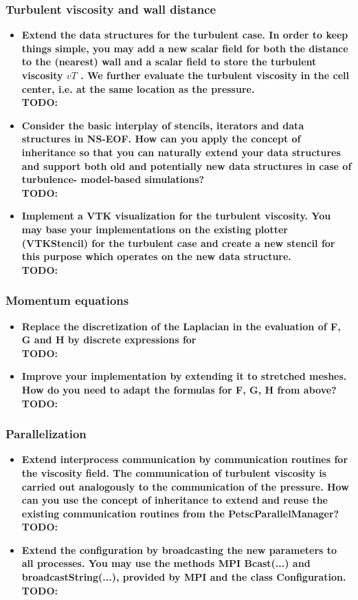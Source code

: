 \documentclass[a4paper]{article}
\newcommand{\td}[1]{
	\textbf{\color{red}TODO: {#1}}
}
\begin{document}
\subsubsection{Turbulent viscosity and wall distance}
\begin{itemize}
	\item \textbf{Extend the data structures for the turbulent case. In order to keep things simple, you may add a new scalar field for both the distance to the (nearest) wall and a scalar field to store the turbulent viscosity $vT$ . We further evaluate the turbulent viscosity in the cell center, i.e. at the same location as the pressure.}\\
	\td{}
	\item \textbf{Consider the basic interplay of stencils, iterators and data structures in NS-EOF. How can you apply the concept of inheritance so that you can naturally extend your data structures and support both old and potentially new data structures in case of turbulence- model-based simulations?}\\
	\td{}
	\item \textbf{Implement a VTK visualization for the turbulent viscosity. You may base your implementations on the existing plotter (VTKStencil) for the turbulent case and create a new stencil for this purpose which operates on the new data structure.}\\
	\td{}
\end{itemize}

\subsubsection{Momentum equations}
\begin{itemize}
	\item \textbf{Replace the discretization of the Laplacian in the evaluation of F, G and H by discrete expressions for}\\
	\td{}
	\item \textbf{Improve your implementation by extending it to stretched meshes. How do you need to adapt the formulas for F, G, H from above?}\\
	\td{}
\end{itemize}

\subsubsection{Parallelization}
\begin{itemize}
	\item \textbf{Extend interprocess communication by communication routines for the viscosity field. The communication of turbulent viscosity is carried out analogously to the communication of the pressure. How can you use the concept of inheritance to extend and reuse the existing communication routines from the PetscParallelManager?}\\
	\td{}
	\item \textbf{Extend the configuration by broadcasting the new parameters to all processes. You may use the methods MPI Bcast(...) and broadcastString(...), provided by MPI and the class Configuration.}\\
	\td{}
\end{itemize}
\end{document}
